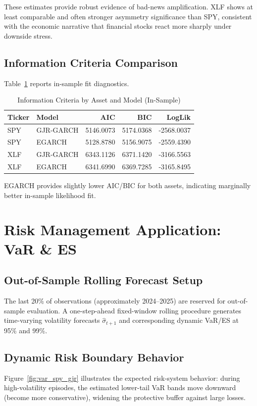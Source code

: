 \documentclass[12pt]{article}
\begin{document}
These estimates provide robust evidence of bad-news amplification. XLF shows at least comparable and often stronger asymmetry significance than SPY, consistent with the economic narrative that financial stocks react more sharply under downside stress.

\subsection{Information Criteria Comparison}
Table~\ref{tab:ic} reports in-sample fit diagnostics.

\begin{table}[htbp]
\centering
\caption{Information Criteria by Asset and Model (In-Sample)}
\label{tab:ic}
\begin{tabular}{llrrr}
\hline
Ticker & Model & AIC & BIC & LogLik \\
\hline
SPY & GJR-GARCH & 5146.0073 & 5174.0368 & -2568.0037 \\
SPY & EGARCH & 5128.8780 & 5156.9075 & -2559.4390 \\
XLF & GJR-GARCH & 6343.1126 & 6371.1420 & -3166.5563 \\
XLF & EGARCH & 6341.6990 & 6369.7285 & -3165.8495 \\
\hline
\end{tabular}
\end{table}

EGARCH provides slightly lower AIC/BIC for both assets, indicating marginally better in-sample likelihood fit.

\section{Risk Management Application: VaR \& ES}
\subsection{Out-of-Sample Rolling Forecast Setup}
The last 20\% of observations (approximately 2024--2025) are reserved for out-of-sample evaluation. A one-step-ahead fixed-window rolling procedure generates time-varying volatility forecasts $\hat{\sigma}_{t+1}$ and corresponding dynamic VaR/ES at 95\% and 99\%.

\subsection{Dynamic Risk Boundary Behavior}
Figure~\ref{fig:var_spy_gjr} illustrates the expected risk-system behavior: during high-volatility episodes, the estimated lower-tail VaR bands move downward (become more conservative), widening the protective buffer against large losses.
\end{document}

